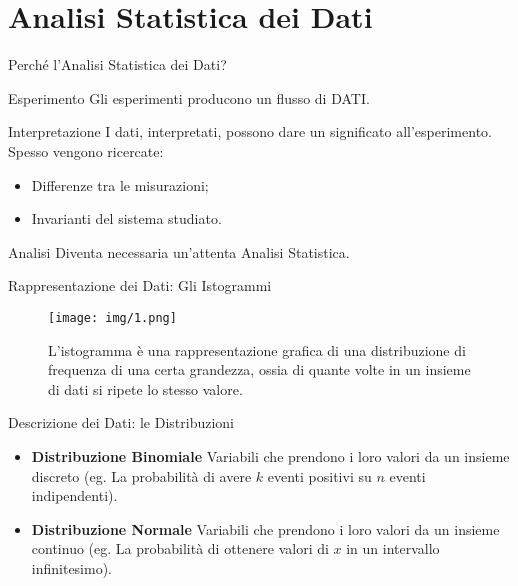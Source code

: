 \documentclass[10pt]{beamer}
\begin{document}
	\section{Analisi Statistica dei Dati}

	\begin{frame}{Perché l'Analisi Statistica dei Dati?}

		\begin{block}{Esperimento} 
		  Gli esperimenti producono un flusso di DATI. 
		\end{block}
		
		\begin{block}{Interpretazione} 
		  I dati, interpretati, possono dare un significato all'esperimento. Spesso vengono ricercate: 
		  \begin{itemize} 
		  	\item Differenze tra le misurazioni; 
		  	\item Invarianti del sistema studiato.
		  \end{itemize}
		\end{block}
		
		\begin{block}{Analisi} 
		  Diventa necessaria un'attenta Analisi Statistica.
		\end{block}

	\end{frame}

	\begin{frame}{Rappresentazione dei Dati: Gli Istogrammi}

		\begin{figure}[1]
			\texttt{[image: img/1.png]}
			\caption{\small{L'istogramma è una rappresentazione grafica di una distribuzione di frequenza di una certa grandezza, ossia di quante volte in un insieme di dati si ripete lo stesso valore.}}
		\end{figure}

	\end{frame}

	\begin{frame}{Descrizione dei Dati: le Distribuzioni}

		\begin{itemize}
			\item \textbf{Distribuzione Binomiale} Variabili che prendono i loro valori da un insieme discreto (eg. La probabilità di avere $k$ eventi positivi su $n$ eventi indipendenti).
			\item \textbf{Distribuzione Normale} Variabili che prendono i loro valori da un insieme continuo (eg. La probabilità di ottenere valori di $x$ in un intervallo infinitesimo).
		\end{itemize}

	\end{frame}
\end{document}
